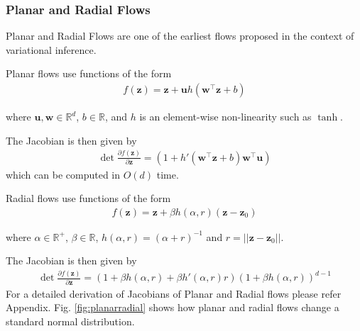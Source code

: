 \documentclass[runningheads]{llncs}
\begin{document}
\subsubsection{Planar and Radial Flows} 
Planar and Radial Flows \cite{rezende2015variational} are one of the earliest flows proposed in the context of variational inference. 

Planar flows use functions of the form
\begin{align}
f(\mathbf{z}) = \mathbf{z} + \mathbf{u}h(\mathbf{w}^\top\mathbf{z} + b)
\label{eq:planarfn}
\end{align}

where $\mathbf{u},\mathbf{w}\in \mathbb{R}^d$, $b \in \mathbb{R}$, and $h$ is an element-wise non-linearity such as $\tanh$.

The Jacobian is then given by
\begin{align}
\det\frac{\partial f(\mathbf{z})}{\partial \mathbf{z}} =(1 + h'(\mathbf{w}^\top\mathbf{z} + b)\mathbf{w}^\top\mathbf{u})
\end{align}
which can be computed in $O(d)$ time.

Radial flows use functions of the form
\begin{align}
f(\mathbf{z}) = \mathbf{z} + \beta h(\alpha,r)(\mathbf{z}-\mathbf{z}_0)
\label{eq:radialfn}
\end{align}

where $\alpha \in \mathbb{R}^+$, $\beta \in \mathbb{R}$, $h(\alpha,r) = (\alpha + r)^{-1}$ and $r = \vert\vert\mathbf{z} - \mathbf{z}_0\vert\vert$.

The Jacobian is then given by
\begin{align}
\det\frac{\partial f(\mathbf{z})}{\partial \mathbf{z}} = \left(1 + \beta h(\alpha,r) + \beta h'(\alpha,r)r\right)(1+\beta h(\alpha,r))^{d-1}
\end{align}
For a detailed derivation of Jacobians of Planar and Radial flows please refer Appendix. Fig. \ref{fig:planarradial} shows how planar and radial flows change a standard normal distribution.
\end{document}
